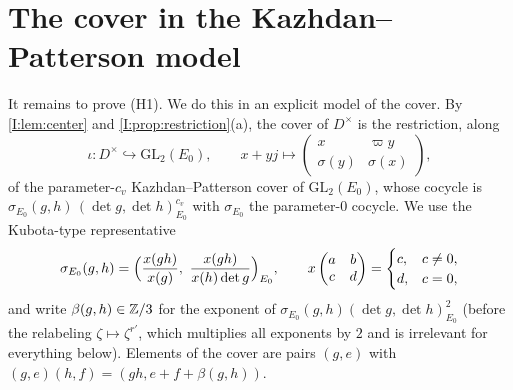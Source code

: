 \section{The cover in the Kazhdan--Patterson model}\label{W:sec:model}
It remains to prove (H1).  We do this in an explicit model of the
cover.  By \cref{I:lem:center} and \cref{I:prop:restriction}(a), the cover of
$D^\times$ is the restriction, along
\begin{equation}\label{W:eq:iota}
 \iota:D^\times\hookrightarrow\mathrm{GL}_2(E_0),\qquad
 x+yj\longmapsto\begin{pmatrix}x&\varpi y\\\sigma(y)&\sigma(x)\end{pmatrix},
\end{equation}
of the parameter-$c_v$ Kazhdan--Patterson cover of $\mathrm{GL}_2(E_0)$,
whose cocycle is $\sigma_{E_0}(g,h)\,(\det g,\det h)_{E_0}^{c_v}$ with
$\sigma_{E_0}$ the parameter-$0$ cocycle.  We use the Kubota-type
representative
\begin{equation}\label{W:eq:kubota}
 \sigma_{E_0}(g,h)=\Bigl(\frac{x(gh)}{x(g)},\ \frac{x(gh)}{x(h)\det g}\Bigr)_{E_0},
 \qquad x\begin{pmatrix}a&b\\c&d\end{pmatrix}=\begin{cases}c,&c\ne0,\\ d,&c=0,\end{cases}
\end{equation}
and write $\beta(g,h)\in\mathbb Z/3$ for the exponent of
$\sigma_{E_0}(g,h)(\det g,\det h)_{E_0}^{2}$ (before the relabeling
$\zeta\mapsto\zeta^{r'}$, which multiplies all exponents by $2$ and is
irrelevant for everything below).  Elements of the cover are pairs
$(g,e)$ with $(g,e)(h,f)=(gh,e+f+\beta(g,h))$.

